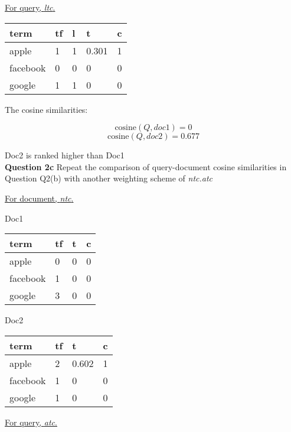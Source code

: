 \documentclass[11pt,a4paper]{report}
\begin{document}
\begin{multicols*}{2}
\noindent \underline{For query, \textit{ltc}.}

\begin{center}
\begin{tabular}{|l | l | l | l | l |}
    \hline
    term     & tf & l & t & c \\
    \hline
    apple    & 1  & 1 & 0.301 & 1\\
    facebook & 0  & 0 & 0 & 0\\
    google   & 1  & 1 & 0 & 0 \\
    \hline
\end{tabular}
\end{center}

\noindent The cosine similarities:

$$\text{cosine}(Q, doc1) = 0$$
$$\text{cosine}(Q, doc2) = 0.677$$

\noindent Doc2 is ranked higher than Doc1\\

\noindent \textbf{Question 2c} Repeat the comparison of query-document cosine similarities in Question Q2(b) with another weighting scheme of \textit{ntc.atc}

\noindent \underline{For document, \textit{ntc}.}

\noindent Doc1

\begin{center}
\begin{tabular}{|l | l | l | l|}
    \hline
    term     & tf & t & c \\
    \hline
    apple    & 0 & 0 & 0 \\
    facebook & 1 & 0 & 0 \\
    google   & 3 & 0 & 0 \\
    \hline
\end{tabular}
\end{center}

\noindent Doc2

\begin{center}
\begin{tabular}{|l | l | l | l|}
    \hline
    term     & tf & t & c \\
    \hline
    apple    & 2 & 0.602 & 1 \\
    facebook & 1 & 0 & 0\\
    google   & 1 & 0 & 0\\
    \hline
\end{tabular}
\end{center}

\noindent \underline{For query, \textit{atc}.}


\end{multicols*}
\end{document}
